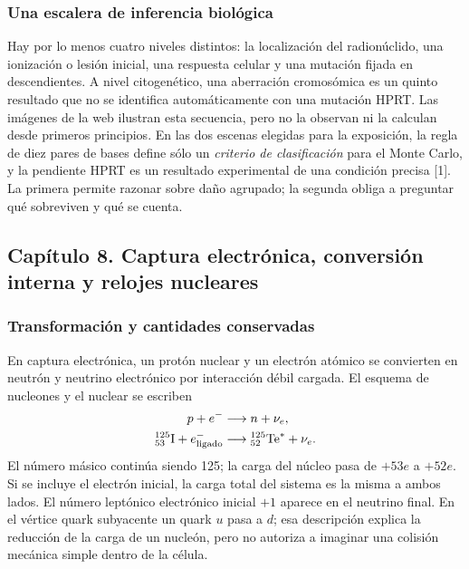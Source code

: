 \subsubsection{Una escalera de inferencia biológica}
Hay por lo menos cuatro niveles distintos: la localización del radionúclido,
una ionización o lesión inicial, una respuesta celular y una mutación fijada
en descendientes. A nivel citogenético, una aberración cromosómica es un
quinto resultado que no se identifica automáticamente con una mutación HPRT.
Las imágenes de la web ilustran esta secuencia, pero no la observan ni la
calculan desde primeros principios. En las dos escenas elegidas para la
exposición, la regla de diez pares de bases define sólo un \emph{criterio de
clasificación} para el Monte Carlo, y la pendiente HPRT es un resultado
experimental de una condición precisa [1]. La primera permite razonar sobre
daño agrupado; la segunda obliga a preguntar qué sobreviven y qué se cuenta.

\clearpage
\subsection{Capítulo 8. Captura electrónica, conversión interna y relojes nucleares}
\label{ampliacion-captura}

\subsubsection{Transformación y cantidades conservadas}
En captura electrónica, un protón nuclear y un electrón atómico se convierten
en neutrón y neutrino electrónico por interacción débil cargada. El esquema
de nucleones y el nuclear se escriben
\begin{align}
p+e^-&\longrightarrow n+\nu_e,\\
{}^{125}_{53}\mathrm I+e^-_{\rm ligado}
 &\longrightarrow{}^{125}_{52}\mathrm{Te}^{*}+\nu_e.
\end{align}
El número másico continúa siendo 125; la carga del núcleo pasa de $+53e$ a
$+52e$. Si se incluye el electrón inicial, la carga total del sistema es la
misma a ambos lados. El número leptónico electrónico inicial $+1$ aparece en
el neutrino final. En el vértice quark subyacente un quark $u$ pasa a $d$;
esa descripción explica la reducción de la carga de un nucleón, pero no
autoriza a imaginar una colisión mecánica simple dentro de la célula.


